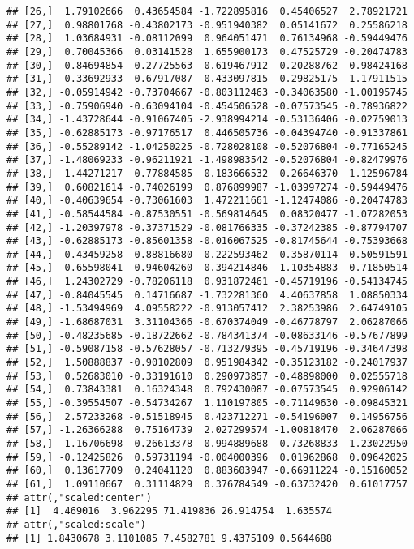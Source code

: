 \documentclass[]{article}
\begin{document}
\begin{verbatim}
## [26,]  1.79102666  0.43654584 -1.722895816  0.45406527  2.78921721
## [27,]  0.98801768 -0.43802173 -0.951940382  0.05141672  0.25586218
## [28,]  1.03684931 -0.08112099  0.964051471  0.76134968 -0.59449476
## [29,]  0.70045366  0.03141528  1.655900173  0.47525729 -0.20474783
## [30,]  0.84694854 -0.27725563  0.619467912 -0.20288762 -0.98424168
## [31,]  0.33692933 -0.67917087  0.433097815 -0.29825175 -1.17911515
## [32,] -0.05914942 -0.73704667 -0.803112463 -0.34063580 -1.00195745
## [33,] -0.75906940 -0.63094104 -0.454506528 -0.07573545 -0.78936822
## [34,] -1.43728644 -0.91067405 -2.938994214 -0.53136406 -0.02759013
## [35,] -0.62885173 -0.97176517  0.446505736 -0.04394740 -0.91337861
## [36,] -0.55289142 -1.04250225 -0.728028108 -0.52076804 -0.77165245
## [37,] -1.48069233 -0.96211921 -1.498983542 -0.52076804 -0.82479976
## [38,] -1.44271217 -0.77884585 -0.183666532 -0.26646370 -1.12596784
## [39,]  0.60821614 -0.74026199  0.876899987 -1.03997274 -0.59449476
## [40,] -0.40639654 -0.73061603  1.472211661 -1.12474086 -0.20474783
## [41,] -0.58544584 -0.87530551 -0.569814645  0.08320477 -1.07282053
## [42,] -1.20397978 -0.37371529 -0.081766335 -0.37242385 -0.87794707
## [43,] -0.62885173 -0.85601358 -0.016067525 -0.81745644 -0.75393668
## [44,]  0.43459258 -0.88816680  0.222593462  0.35870114 -0.50591591
## [45,] -0.65598041 -0.94604260  0.394214846 -1.10354883 -0.71850514
## [46,]  1.24302729 -0.78206118  0.931872461 -0.45719196 -0.54134745
## [47,] -0.84045545  0.14716687 -1.732281360  4.40637858  1.08850334
## [48,] -1.53494969  4.09558222 -0.913057412  2.38253986  2.64749105
## [49,] -1.68687031  3.31104366 -0.670374049 -0.46778797  2.06287066
## [50,] -0.48235685 -0.18722662 -0.784341374 -0.08633146 -0.57677899
## [51,] -0.59087158 -0.57628057 -0.713279395 -0.45719196 -0.34647398
## [52,]  1.50888837 -0.90102809  0.951984342 -0.35123182 -0.24017937
## [53,]  0.52683010 -0.33191610  0.290973857 -0.48898000  0.02555718
## [54,]  0.73843381  0.16324348  0.792430087 -0.07573545  0.92906142
## [55,] -0.39554507 -0.54734267  1.110197805 -0.71149630 -0.09845321
## [56,]  2.57233268 -0.51518945  0.423712271 -0.54196007  0.14956756
## [57,] -1.26366288  0.75164739  2.027299574 -1.00818470  2.06287066
## [58,]  1.16706698  0.26613378  0.994889688 -0.73268833  1.23022950
## [59,] -0.12425826  0.59731194 -0.004000396  0.01962868  0.09642025
## [60,]  0.13617709  0.24041120  0.883603947 -0.66911224 -0.15160052
## [61,]  1.09110667  0.31114829  0.376784549 -0.63732420  0.61017757
## attr(,"scaled:center")
## [1]  4.469016  3.962295 71.419836 26.914754  1.635574
## attr(,"scaled:scale")
## [1] 1.8430678 3.1101085 7.4582781 9.4375109 0.5644688
\end{verbatim}
\end{document}
